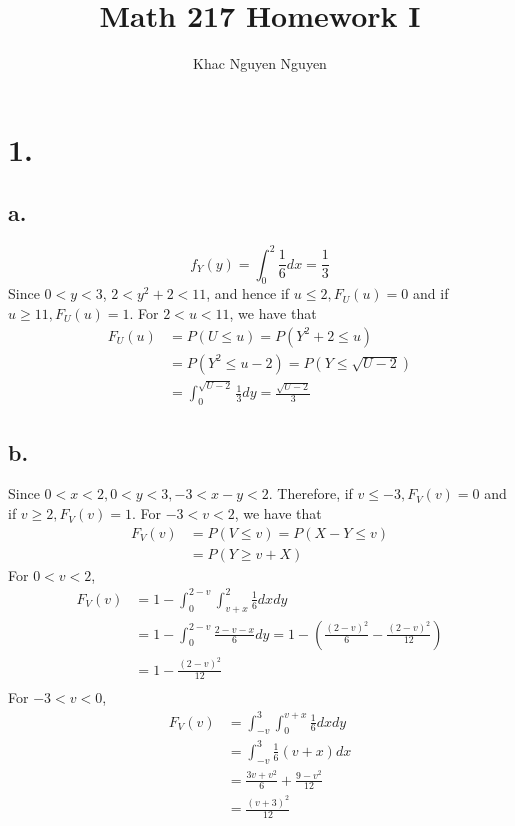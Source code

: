 \documentclass[11pt]{article}
\title{\textbf{Math 217 Homework I}}
\author{Khac Nguyen Nguyen}
\date{}
\begin{document}
\section*{1.}
\subsection*{a.}
\[
    f_Y(y) = \int_0^2 \frac{1}{6}dx = \frac{1}{3}    
\]
Since $0<y<3$, $2<y^2 +2<11$, and hence if $u\le 2, F_U(u) = 0$ and if $u \ge 11, F_U(u) = 1$. For $2<u<11$, we have that
\begin{equation*}
    \begin{aligned}
        F_U(u) &= P(U\le u) = P(Y^2+2 \le u) \\
        &= P(Y^2 \le u-2) = P(Y \le \sqrt{U-2}) \\
        &= \int^{\sqrt{U-2}}_0 \frac{1}{3}dy = \frac{\sqrt{U-2}}{3}
    \end{aligned}
\end{equation*}
\subsection*{b.}
Since $0<x<2, 0<y<3, -3<x-y<2$. Therefore, if $v \le -3, F_V(v) = 0$ and if $v\ge 2, F_V(v) = 1$. 
For $-3<v<2$, we have that
\begin{equation*}
    \begin{aligned}
        F_V(v) &= P(V \le v) = P(X-Y\le v) \\
        &= P(Y\ge v+X)         
    \end{aligned}
\end{equation*}
For $0<v<2$,
\begin{equation*}
    \begin{aligned}
        F_V(v) &= 1-\int_0^{2-v} \int_{v+x}^{2} \frac{1}{6} dxdy \\
        &= 1- \int_0^{2-v} \frac{2-v-x}{6} dy = 1- \left(\frac{(2-v)^2}{6} - \frac{(2-v)^2}{12}\right) \\
        &= 1- \frac{(2-v)^2}{12} \\
    \end{aligned}
\end{equation*}
For $-3<v<0$, 
\begin{equation*}
    \begin{aligned}
        F_V(v) &= \int_{-v}^3 \int_0^{v+x} \frac{1}{6} dx dy \\
        &= \int_{-v}^3 \frac{1}{6}(v+x) dx \\
        &= \frac{3v+v^2}{6} + \frac{9-v^2}{12} \\
        &= \frac{(v+3)^2}{12}
    \end{aligned}
\end{equation*}
\pagebreak
\end{document}
